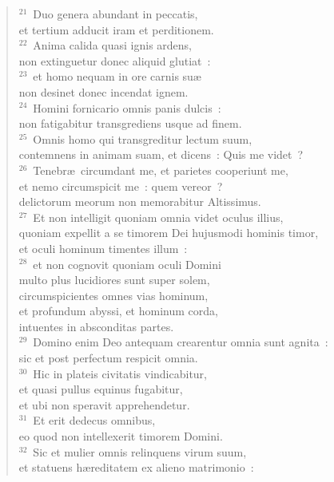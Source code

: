 \begin{flushleft}\begin{verse}${}^{21}$~Duo genera abundant in peccatis,\\ et tertium adducit iram et perditionem.\\
${}^{22}$~Anima calida quasi ignis ardens,\\ non extinguetur donec aliquid glutiat~:\\
${}^{23}$~et homo nequam in ore carnis su\ae \\ non desinet donec incendat ignem.\\
${}^{24}$~Homini fornicario omnis panis dulcis~:\\ non fatigabitur transgrediens usque ad finem.\\
${}^{25}$~Omnis homo qui transgreditur lectum suum,\\ contemnens in animam suam, et dicens~: Quis me videt~?\\
${}^{26}$~Tenebr\ae\ circumdant me, et parietes cooperiunt me,\\ et nemo circumspicit me~: quem vereor~?\\ delictorum meorum non memorabitur Altissimus.\\
${}^{27}$~Et non intelligit quoniam omnia videt oculus illius,\\ quoniam expellit a se timorem Dei hujusmodi hominis timor,\\ et oculi hominum timentes illum~:\\
${}^{28}$~et non cognovit quoniam oculi Domini\\ multo plus lucidiores sunt super solem,\\ circumspicientes omnes vias hominum,\\ et profundum abyssi, et hominum corda,\\ intuentes in absconditas partes.\\
${}^{29}$~Domino enim Deo antequam crearentur omnia sunt agnita~:\\ sic et post perfectum respicit omnia.\\
${}^{30}$~Hic in plateis civitatis vindicabitur,\\ et quasi pullus equinus fugabitur,\\ et ubi non speravit apprehendetur.\\
${}^{31}$~Et erit dedecus omnibus,\\ eo quod non intellexerit timorem Domini.\\
${}^{32}$~Sic et mulier omnis relinquens virum suum,\\ et statuens h\ae reditatem ex alieno matrimonio~:\\

\end{verse}
\end{flushleft}
